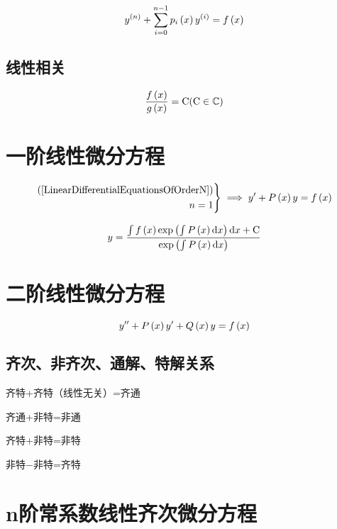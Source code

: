 \documentclass{article}
\begin{document}
\begin{definition}[]
    \[y^{\left(n\right)}+\sum_{i=0}^{n-1}p_i\left(x\right)y^{\left(i\right)}=f\left(x\right)\label{LinearDifferentialEquationsOfOrderN}\]
\end{definition}

\subsection{线性相关}

\[\frac{f\left(x\right)}{g\left(x\right)}=\mathrm C(\mathrm C\in\mathbb C)\]

\section{一阶线性微分方程}

\begin{definition}
    \[\left.\begin{aligned}
            \left(\ref{LinearDifferentialEquationsOfOrderN}\right) \\
            n=1
        \end{aligned}\right\}
        \implies
        y^\prime+P\left(x\right)y=f\left(x\right)\]
\end{definition}

\begin{theorem}[通解]
    \[y=\frac{\int{f\left(x\right)\exp\left(\int P\left(x\right)\mathrm dx\right)\mathrm dx}+\mathrm C}{\exp\left(\int P\left(x\right)\mathrm d x\right)}\]
\end{theorem}

\section{二阶线性微分方程}

\begin{definition}[]
    \[y^{\prime\prime}+P\left(x\right)y^\prime+Q\left(x\right)y=f\left(x\right)\]
\end{definition}

\subsection{齐次、非齐次、通解、特解关系}

齐特+齐特（线性无关）=齐通

齐通+非特=非通

齐特+非特=非特

非特$-$非特=齐特

\section{n阶常系数线性齐次微分方程}
\end{document}
